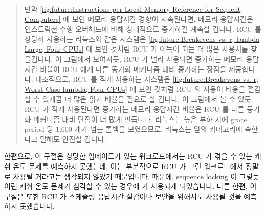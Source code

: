 \fi

\begin{quote}
	만약
	\cref{fig:future:Instructions per Local Memory Reference for Sequent Computers}
	에 보인 메모리 응답시간 경향이 지속된다면, 메모리 응답시간은 인스트럭션
	수행 오버헤드에 비해 상대적으로 증가하길 계속할 겁니다.
	RCU 를 상당히 사용하는 리눅스와 같은 시스템은
	\cref{fig:future:Breakevens vs. r; lambda Large; Four CPUs} 에 보인
	것처럼 RCU 가 이득이 되는 더 많은 사용처를 찾을겁니다.
	이 그림에서 보여지듯, RCU 가 널리 사용되면 증가하는 메모리 응답시간
	비율이 RCU 에게 다른 동기화 메커니즘 대비 증가하는 장점을 제공합니다.
	대조적으로, RCU 를 적게 사용하는 시스템은
	\cref{fig:future:Breakevens vs. r; Worst-Case lambda; Four CPUs}
	에 보인 것처럼 RCU 의 사용이 비용을 절감할 수 있게끔 더 많은 읽기
	비율을 필요로 할 겁니다.
	이 그림에서 볼 수 있듯, RCU 가 적게 사용된다면 증가하는 메모리 응답시간
	비율은 RCU 를 다른 동기화 메커니즘 대비 단점이 더 많게 만듭니다.
	리눅스는 높은 부하 시에 grace period 당 1,600 개가 넘는 콜백을
	보였으므로, 리눅스는 앞의 카테고리에 속한다고 말해도 안전할 겁니다.

\end{quote}

한편으로, 이 구절은 상당한 업데이트가 있는 워크로드에서는 RCU 가 겪을 수 있는
캐쉬 온도 문제를 예측하지 못했는데, 이는 부분적으로 RCU 가 그런 워크로드에서
정말로 사용될 거라고는 생각되지 않았기 때문입니다.
때문에, sequence locking 이 그렇듯 이런 캐쉬 온도 문제가 심각할 수 있는 경우에
 가 사용되게 되었습니다.
다른 한편, 이 구절은 또한 RCU 가 스케쥴링 응답시간 절감이나 보안을 위해서도
사용될 것을 예측하지 못했습니다.

